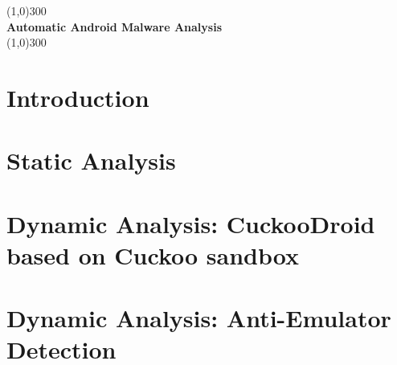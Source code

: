 \documentclass{article}
\begin{document}
	\begin{titlepage}
		\begin{center}
			\line(1,0){300}\\
			\huge{\bfseries Automatic Android Malware Analysis}\\
			\line(1,0){300}\\
		\end{center}
	\end{titlepage}
	
	\tableofcontents
	\cleardoublepage
	
	\section{Introduction}\label{sec:intro}
		
		\pagebreak
	\section{Static Analysis}\label{sec:static_analysis}
		
		\pagebreak
	\section{Dynamic Analysis: CuckooDroid based on Cuckoo sandbox}\label{sec:cuckoodroid}
		
		\pagebreak
	
	\section{Dynamic Analysis: Anti-Emulator Detection} \label{sec:Chp4}
		
		\pagebreak
	
	
	
\end{document}
